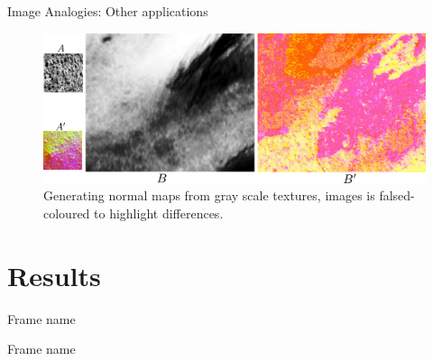 \documentclass{beamer}
\begin{document}

\begin{frame}{Image Analogies: Other applications}
\begin{figure}
        \centering
        \includegraphics[width=\textwidth]{img/normal_generation}
        \caption{Generating normal maps from gray scale textures, images is falsed-coloured to highlight differences.}
\end{figure}
\end{frame}

\section{Results}
\begin{frame}{Frame name}
\end{frame}


\begin{frame}{Frame name}

\end{frame}



%
\end{document}
